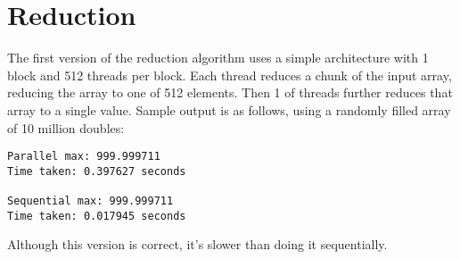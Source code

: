 \documentclass[a4paper]{article}
\begin{document}
\section{Reduction}
The first version of the reduction algorithm uses a simple architecture with 1
block and 512 threads per block. Each thread reduces a chunk of the input array,
reducing the array to one of 512 elements. Then 1 of threads further reduces
that array to a single value.
Sample output is as follows, using a randomly filled array of 10 million
doubles:
\begin{verbatim}
Parallel max: 999.999711
Time taken: 0.397627 seconds

Sequential max: 999.999711
Time taken: 0.017945 seconds
\end{verbatim}
Although this version is correct, it's slower than doing it sequentially.
\end{document}
